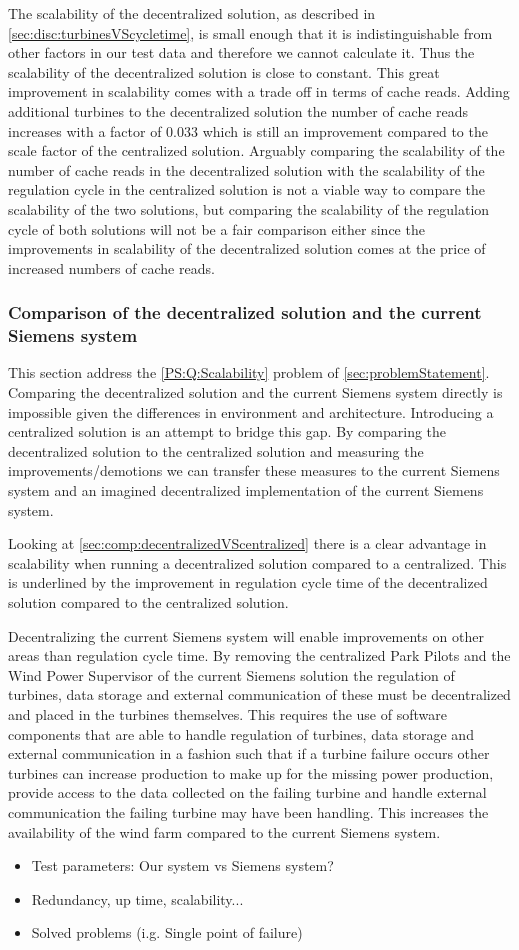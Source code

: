 The scalability of the decentralized solution, as described in \cref{sec:disc:turbinesVScycletime}, is small enough that it is indistinguishable from other factors in our test data and therefore we cannot calculate it. Thus the scalability of the decentralized solution is close to constant. This great improvement in scalability comes with a trade off in terms of cache reads. Adding additional turbines to the decentralized solution the number of cache reads increases with a factor of $0.033$ which is still an improvement compared to the scale factor of the centralized solution. Arguably comparing the scalability of the number of cache reads in the decentralized solution with the scalability of the regulation cycle in the centralized solution is not a viable way to compare the scalability of the two solutions, but comparing the scalability of the regulation cycle of both solutions will not be a fair comparison either since the improvements in scalability of the decentralized solution comes at the price of increased numbers of cache reads.

\subsubsection{Comparison of the decentralized solution and the current Siemens system}
This section address the \ref{PS:Q:Scalability} problem of \cref{sec:problemStatement}.
Comparing the decentralized solution and the current Siemens system directly is impossible given the differences in environment and architecture. Introducing a centralized solution is an attempt to bridge this gap. By comparing the decentralized solution to the centralized solution and measuring the improvements/demotions we can transfer these measures to the current Siemens system and an imagined decentralized implementation of the current Siemens system.

Looking at \cref{sec:comp:decentralizedVScentralized} there is a clear advantage in scalability when running a decentralized solution compared to a centralized. This is underlined by the improvement in regulation cycle time of the decentralized solution compared to the centralized solution.

Decentralizing the current Siemens system will enable improvements on other areas than regulation cycle time. By removing the centralized Park Pilots and the Wind Power Supervisor of the current Siemens solution the regulation of turbines, data storage and external communication of these must be decentralized and placed in the turbines themselves. This requires the use of software components that are able to handle regulation of turbines, data storage and external communication in a fashion such that if a turbine failure occurs other turbines can increase production to make up for the missing power production, provide access to the data collected on the failing turbine and handle external communication the failing turbine may have been handling. This increases the availability of the wind farm compared to the current Siemens system.

\begin{itemize}
	\item Test parameters: Our system vs Siemens system?
	\item Redundancy, up time, scalability...
	\item Solved problems (i.g. Single point of failure)
\end{itemize}


